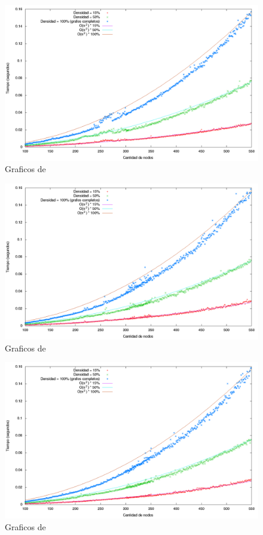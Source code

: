 \begin{figure}[H]
\begin{center}
\includegraphics[scale=0.4]{./img/greedyN1.png}
\caption{Graficos de}
\end{center}
\end{figure}

\begin{figure}[H]
\begin{center}
\includegraphics[scale=0.4]{./img/greedyN2.png}
\caption{Graficos de}
\end{center}
\end{figure}

\begin{figure}[H]
\begin{center}
\includegraphics[scale=0.4]{./img/greedyN3.png}
\caption{Graficos de}
\end{center}
\end{figure}


